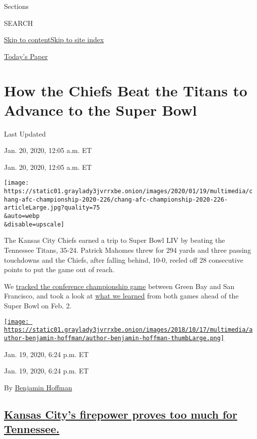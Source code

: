 Sections

SEARCH

\protect\hyperlink{site-content}{Skip to
content}\protect\hyperlink{site-index}{Skip to site index}

\href{https://myaccount.nytimes3xbfgragh.onion/auth/login?response_type=cookie\&client_id=vi}{}

\href{https://www.nytimes3xbfgragh.onion/section/todayspaper}{Today's
Paper}

\hypertarget{how-the-chiefs-beat-the-titans-to-advance-to-the-super-bowl}{%
\section{How the Chiefs Beat the Titans to Advance to the Super
Bowl}\label{how-the-chiefs-beat-the-titans-to-advance-to-the-super-bowl}}

Last Updated

Jan. 20, 2020, 12:05 a.m. ET

Jan. 20, 2020, 12:05 a.m. ET

\texttt{[image: https://static01.graylady3jvrrxbe.onion/images/2020/01/19/multimedia/chang-afc-championship-2020-226/chang-afc-championship-2020-226-articleLarge.jpg?quality=75\\\&auto=webp\\\&disable=upscale]}

The Kansas City Chiefs earned a trip to Super Bowl LIV by beating the
Tennessee Titans, 35-24. Patrick Mahomes threw for 294 yards and three
passing touchdowns and the Chiefs, after falling behind, 10-0, reeled
off 28 consecutive points to put the game out of reach.

We
\href{https://www.nytimes3xbfgragh.onion/live/2020/packers-49ers}{tracked
the conference championship game} between Green Bay and San Francisco,
and took a look at
\href{https://www.nytimes3xbfgragh.onion/2020/01/20/sports/football/49ers-chiefs-super-bowl.html}{what
we learned} from both games ahead of the Super Bowl on Feb. 2.

\href{https://www.nytimes3xbfgragh.onion/by/benjamin-hoffman}{\texttt{[image: https://static01.graylady3jvrrxbe.onion/images/2018/10/17/multimedia/author-benjamin-hoffman/author-benjamin-hoffman-thumbLarge.png]}}

Jan. 19, 2020, 6:24 p.m. ET

Jan. 19, 2020, 6:24 p.m. ET

By
\href{https://www.nytimes3xbfgragh.onion/by/benjamin-hoffman}{Benjamin
Hoffman}

\hypertarget{kansas-citys-firepower-proves-too-much-for-tennessee}{%
\subsection{\texorpdfstring{\protect\hyperlink{kansas-citys-firepower-proves-too-much-for-tennessee}{Kansas
City's firepower proves too much for
Tennessee.}}{Kansas City's firepower proves too much for Tennessee.}}\label{kansas-citys-firepower-proves-too-much-for-tennessee}}

